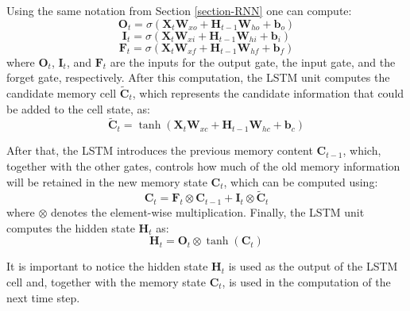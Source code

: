 Using the same notation from Section \ref{section-RNN} one can compute:
\begin{equation}
    \boldsymbol{O}_t = \sigma\left(\boldsymbol{X}_t \boldsymbol{W}_{xo} + \boldsymbol{H}_{t-1}\boldsymbol{W}_{ho} + \boldsymbol{b}_o\right)
    \label{eq-LSTM-Ot}
\end{equation}
\begin{equation}
    \boldsymbol{I}_t = \sigma\left(\boldsymbol{X}_t \boldsymbol{W}_{xi} + \boldsymbol{H}_{t-1}\boldsymbol{W}_{hi} + \boldsymbol{b}_i\right)
    \label{eq-LSTM-It}
\end{equation}
\begin{equation}
    \boldsymbol{F}_t = \sigma\left(\boldsymbol{X}_t \boldsymbol{W}_{xf} + \boldsymbol{H}_{t-1}\boldsymbol{W}_{hf} + \boldsymbol{b}_f\right)
    \label{eq-LSTM-Ft}
\end{equation}
where $\boldsymbol{O}_t$, $\boldsymbol{I}_t$, and $\boldsymbol{F}_t$ are the inputs for the output gate, the input gate, and the forget gate, respectively. After this computation, the LSTM unit computes the candidate memory cell $\boldsymbol{\tilde{C}}_t$, which represents the candidate information that could be added to the cell state, as:
\begin{equation}
    \boldsymbol{\tilde{C}}_t = \tanh \left(\boldsymbol{X}_t \boldsymbol{W}_{xc} + \boldsymbol{H}_{t-1}\boldsymbol{W}_{hc} + \boldsymbol{b}_c\right)
    \label{eq-CNN-Candidate}
\end{equation}

After that, the LSTM introduces the previous memory content $\boldsymbol{C}_{t-1}$, which, together with the other gates, controls how much of the old memory information will be retained in the new memory state $\boldsymbol{C}_{t}$, which can be computed using: 
\begin{equation}
    \boldsymbol{C}_t = \boldsymbol{F}_t \otimes \boldsymbol{C}_{t-1} + \boldsymbol{I}_t \otimes \boldsymbol{\tilde{C}}_t
\end{equation}
where $\otimes$ denotes the element-wise multiplication. Finally, the LSTM unit computes the hidden state $\boldsymbol{H}_t$ as:
\begin{equation}
    \boldsymbol{H}_t = \boldsymbol{O}_t \otimes \tanh (\boldsymbol{C}_t)
\end{equation}

It is important to notice the hidden state $\boldsymbol{H}_t$ is used as the output of the LSTM cell and, together with the memory state $\boldsymbol{C}_t$, is used in the computation of the next time step.

